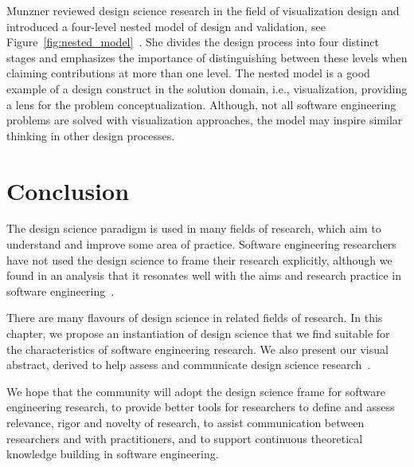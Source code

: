 \documentclass[graybox]{svmult}
\newcommand{\per}[1]{\textcolor{cyan}{{\it [Per says: #1]}}}
\newcommand{\per}[1]{}
\begin{document}
Munzner reviewed design science research in the field of visualization design and introduced a four-level nested model of design and validation, see Figure~\ref{fig:nested_model}~\cite{munzner2009}. She divides the design process into four distinct stages and emphasizes the importance of distinguishing between these levels when claiming contributions at more than one level. The nested model is a good example of a design construct in the solution domain, i.e., visualization, providing a lens for the problem conceptualization. Although, not all software engineering problems are solved with visualization approaches, the model may inspire similar thinking in other design processes. 







\section{Conclusion}
\label{sec:conclusion}
The design science paradigm is used in many fields of research, which aim to understand and improve some area of practice. Software engineering researchers have not used the design science to frame their research explicitly, although we found in an analysis that it resonates well with the aims and research practice in software engineering~\cite{Engstrom19arxiv}. 

There are many flavours of design science in related fields of research. In this chapter, we propose an instantiation of design science that we find suitable for the characteristics of software engineering research. We also present our visual abstract, derived to help assess and communicate design science research~\cite{StoreyESEM17}. 

We hope that the community will adopt the design science frame for software engineering research, to provide better tools for researchers to define and assess relevance, rigor and novelty of research, to assist communication between researchers and with practitioners, and to support continuous theoretical knowledge building in software engineering. 




\end{document}
